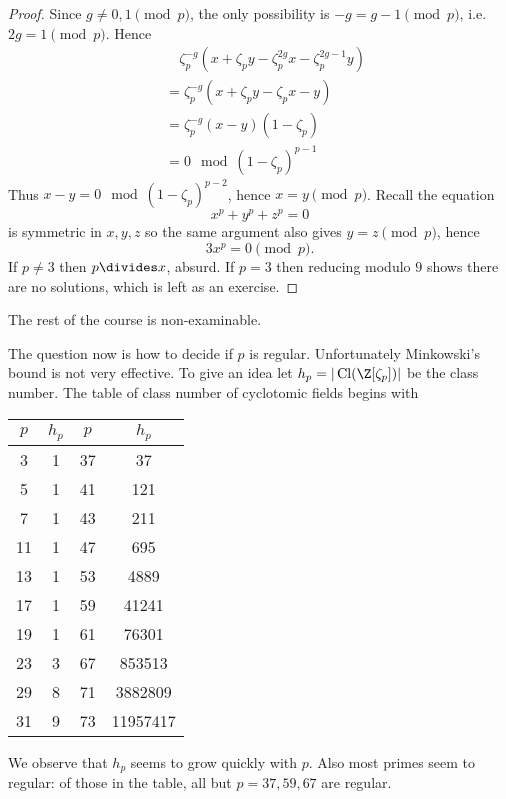 \documentclass[a4paper]{article}
\DeclareMathOperator{\Cl}{Cl} %
\begin{document}
\begin{proof}
  Since \(g \neq 0, 1 \pmod p\), the only possibility is \(-g = g - 1 \pmod p\), i.e.\  \(2g = 1 \pmod p\). Hence
  \begin{align*}
    & \quad \zeta_p^{-g}(x + \zeta_p y - \zeta_p^{2g} x - \zeta_p^{2g - 1} y) \\
    &= \zeta_p^{-g} (x + \zeta_p y - \zeta_p x - y) \\
    &= \zeta_p^{-g} (x - y) (1 - \zeta_p) \\
    &= 0 \mod{(1 - \zeta_p)^{p - 1}}
  \end{align*}
  Thus \(x - y = 0 \mod{(1 - \zeta_p)^{p - 2}}\), hence \(x = y \pmod p\). Recall the equation
  \[
    x^p + y^p + z^p = 0
  \]
  is symmetric in \(x, y, z\) so the same argument also gives \(y = z \pmod p\), hence
  \[
    3x^p = 0 \pmod p.
  \]
  If \(p \neq 3\) then \(p \divides x\), absurd. If \(p = 3\) then reducing modulo \(9\) shows there are no solutions, which is left as an exercise.
\end{proof}

The rest of the course is non-examinable.

The question now is how to decide if \(p\) is regular. Unfortunately Minkowski's bound is not very effective. To give an idea let \(h_p = |\Cl(\Z[\zeta_p])|\) be the class number. The table of class number of cyclotomic fields begins with
\begin{table}[ht]
  \centering
  \begin{tabular}{|c|c||c|c|}
    \(p\) & \(h_p\) & \(p\) & \(h_p\) \\ \hline
    3 & 1 & 37 & 37 \\ \hline
    5 & 1 & 41 & 121 \\ \hline
    7 & 1 & 43 & 211 \\ \hline
    11 & 1 & 47 & 695 \\ \hline
    13 & 1 & 53 & 4889 \\ \hline
    17 & 1 & 59 & 41241 \\ \hline
    19 & 1 & 61 & 76301 \\ \hline
    23 & 3 & 67 & 853513 \\ \hline
    29 & 8 & 71 & 3882809 \\ \hline
    31 & 9 & 73 & 11957417 \\
  \end{tabular}
\end{table}

We observe that \(h_p\) seems to grow quickly with \(p\). Also most primes seem to regular: of those in the table, all but \(p = 37, 59, 67\) are regular.
\end{document}

